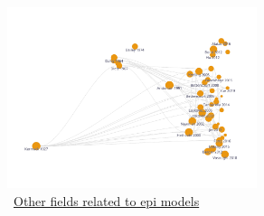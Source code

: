 \begin{figure}[!ht] \centering  %
	\caption{ ~\href{https://app.litmaps.co/shared/07C0B3F0-B4A9-4627-923C-857F1ABFD2D3}{Other fields related to epi models}}
	\label{fig:graph_other}
	\centerline{\includegraphics[width=0.65\textwidth]{./figures/graph_other}}
\end{figure}